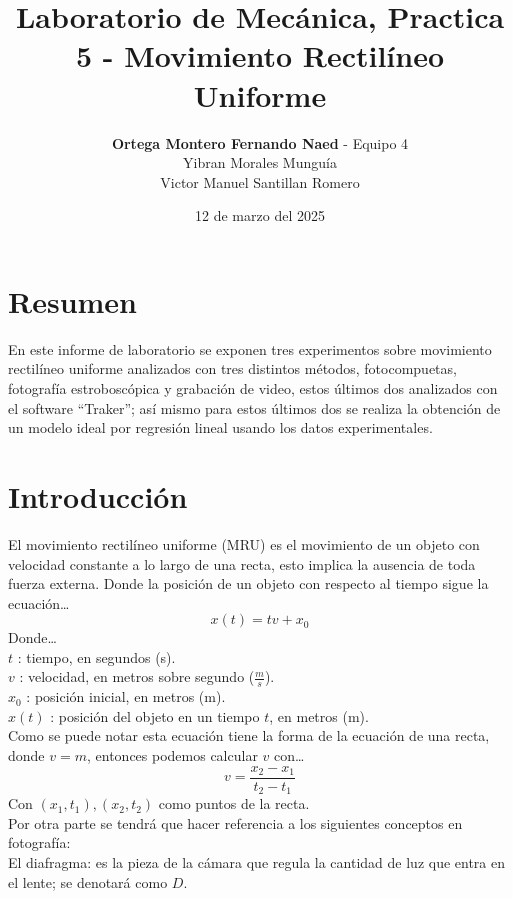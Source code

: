 \documentclass[12pt,a4paper]{article}
\begin{document}
\title{Laboratorio de Mecánica, Practica 5 - Movimiento Rectilíneo Uniforme}
\date{12 de marzo del 2025}
\author{\textbf{Ortega Montero Fernando Naed} - Equipo 4\\
Yibran Morales Munguía\\
Victor Manuel Santillan Romero}
\maketitle
\section{Resumen} 

En este informe de laboratorio se exponen tres experimentos sobre movimiento rectilíneo uniforme analizados con tres distintos métodos, fotocompuetas, fotografía estroboscópica y grabación de video, estos últimos dos analizados con el software “Traker”; así mismo para estos últimos dos se realiza la obtención de un modelo ideal por regresión lineal usando los datos experimentales.

\section{Introducción}

El movimiento rectilíneo uniforme (MRU) es el movimiento de un objeto con velocidad constante a lo largo de una recta, esto implica la ausencia de toda fuerza externa. Donde la posición de un objeto con respecto al tiempo sigue la ecuación…
\[x(t) = t v + x_0\]
Donde…\\

\noindent$t$ : tiempo, en segundos (s).\\
 $v$ : velocidad, en metros sobre segundo ($\frac{m}{s}$).\\
$x_0$ : posición inicial, en metros (m).\\
$x(t)$ : posición del objeto en un tiempo $t$, en metros (m).\\

Como se puede notar esta ecuación tiene la forma de la ecuación de una recta, donde $v = m$, entonces podemos calcular $v$ con…
\[v = \frac{x_2 - x_1}{t_2 - t_1}\]
Con $(x_1, t_1), (x_2, t_2)$ como puntos de la recta.\\

Por otra parte se tendrá que hacer referencia a los siguientes conceptos en fotografía: \\

El diafragma: es la pieza de la cámara que regula la cantidad de luz que entra en el lente; se denotará como $D$.\\
\end{document}

